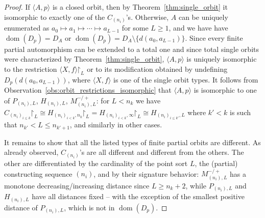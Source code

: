 \documentclass[10pt,a4paper]{article}
\theoremstyle{definition}
\theoremstyle{remark}
\newcommand \set [1]{\{#1\}}
\newcommand \seq [1]{\langle #1 \rangle}
\newcommand \restr [1] {\mathord{\upharpoonright}_{#1}}
\newcommand \dom {\operatorname{dom}}
\begin{document}
\begin{proof}
    
    If $\seq{A, p}$ is a closed orbit, then by Theorem~\ref{thm:single_orbit} it isomorphic to exactly one of the $C_{(n_i)}$'s.
    Otherwise, $A$ can be uniquely enumerated as $a_0 \mapsto a_1 \mapsto \cdots \mapsto a_{L - 1}$ for some $L \geq 1$, and we have have $\dom(D_p) = D_A$ or $\dom(D_p) = D_A \setminus \set{d(a_0, a_{L - 1})}$.
    Since every finite partial automorphism can be extended to a total one and since total single orbits were characterized by Theorem~\ref{thm:single_orbit}, $\seq{A, p}$ is uniquely isomorphic to the restriction $\seq{X, f}\restr{L}$ or to its modification  obtained by undefining  $D_p(d(a_0, a_{L - 1}))$, where $\seq{X, f}$ is one of the single orbit types.
    It follows from Observation~\ref{obs:orbit_restrictions_isomorphic} that $\seq{A, p}$ is isomorphic to one of $P_{(n_i), L}$, $H_{(n_i), L}$, $M^{-/+}_{(n_i), L}$: 
    for $L < n_k$ we have $C_{(n_i)_{i\leq k}}\restr{L} \cong H_{(n_i)_{i < k}, n_k}\restr{L} = H_{(n_i)_{i < k}, \infty}\restr{L} \cong H_{(n_i)_{i \leq k'}, L}$ where $k' < k$ is such that $n_{k'} < L \leq n_{k' + 1}$, and similarly in other cases.

    It remains to show that all the listed types of finite partial orbits are different.
    As already observed, $C_{(n_i)}$'s are all different and different from the others.
    The other are differentiated by the cardinality of the point sort $L$, the (partial) constructing sequence $(n_i)$, and by their signature behavior:
    $M^{-/+}_{(n_i), L}$ has a monotone decreasing/increasing distance since $L \geq n_k + 2$, while $P_{(n_i), L}$ and $H_{(n_i), L}$ have all distances fixed – with the exception of the smallest positive distance of $P_{(n_i), L}$, which is not in $\dom(D_p)$.
\end{proof}


\color{black}
\end{document}
